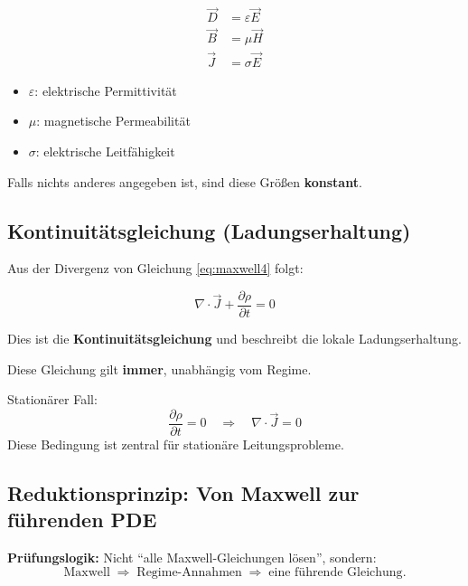 \documentclass[a4paper]{article}
\newcommand{\imp}[1]{{\color{accent}\bfseries #1}}
\newcommand{\E}{\vec E}
\newcommand{\D}{\vec D}
\newcommand{\Hf}{\vec H}
\newcommand{\B}{\vec B}
\newcommand{\J}{\vec J}
\newcommand{\eps}{\varepsilon}
\begin{document}
\begin{align}
\D &= \eps \E \\
\B &= \mu \Hf \\
\J &= \sigma \E
\end{align}

\begin{checkitem}
\begin{itemize}
  \item $\eps$: elektrische Permittivität
  \item $\mu$: magnetische Permeabilität
  \item $\sigma$: elektrische Leitfähigkeit
\end{itemize}
Falls nichts anderes angegeben ist, sind diese Größen \imp{konstant}.
\end{checkitem}

\subsection{Kontinuitätsgleichung (Ladungserhaltung)}

Aus der Divergenz von Gleichung \eqref{eq:maxwell4} folgt:

\[
\nabla \cdot \J + \frac{\partial \rho}{\partial t} = 0
\]

Dies ist die \imp{Kontinuitätsgleichung} und beschreibt die lokale Ladungserhaltung.

\begin{merke}
Diese Gleichung gilt \imp{immer}, unabhängig vom Regime.
\end{merke}

\begin{checkitem}
Stationärer Fall:
\[
\frac{\partial \rho}{\partial t} = 0
\quad \Rightarrow \quad
\nabla \cdot \J = 0
\]
Diese Bedingung ist zentral für stationäre Leitungsprobleme.
\end{checkitem}

\subsection{Reduktionsprinzip: Von Maxwell zur führenden PDE}

\begin{schema}
\imp{Prüfungslogik:}  
Nicht ``alle Maxwell-Gleichungen lösen'', sondern:
\[
\text{Maxwell} \;\Rightarrow\; \text{Regime-Annahmen} \;\Rightarrow\; \text{eine führende Gleichung}.
\]
\end{schema}
\end{document}
